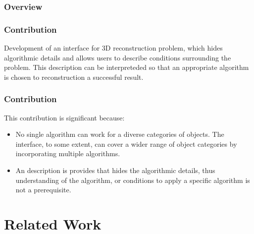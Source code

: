 \documentclass{beamer}
\begin{document}
\begin{frame}
\frametitle{Overview} %
\tableofcontents[currentsection,currentsubsection, 
    hideothersubsections, 
    sectionstyle=show/shaded,] %
\end{frame}

\begin{frame}
\frametitle{Contribution}
Development of an interface for 3D reconstruction problem, which hides algorithmic details and allows users to describe conditions surrounding the problem. This description can be interpreteded so that an appropriate algorithm is chosen to reconstruction a successful result.
\end{frame}

\begin{frame}
\frametitle{Contribution}
This contribution is significant because:
\begin{itemize}
\item No single algorithm can work for a diverse categories of objects. The interface, to some extent, can cover a wider range of object categories by incorporating multiple algorithms.
\item An description is provides that hides the algorithmic details, thus understanding of the algorithm, or conditions to apply a specific algorithm is not a prerequisite.
\end{itemize}
\end{frame}

\section{Related Work} %
\end{document}
